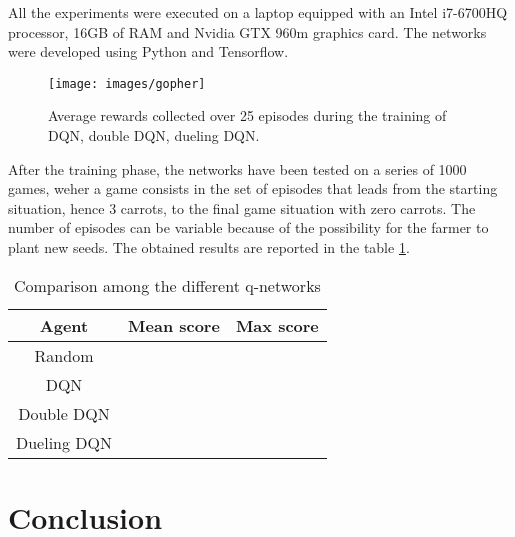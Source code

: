 \documentclass[article,11pt]{article}
\begin{document}
	All the experiments were executed on a laptop equipped with an Intel i7-6700HQ processor, 16GB of RAM and Nvidia GTX 960m graphics card. The networks were developed using Python and Tensorflow.
	
	\begin{figure}
		\texttt{[image: images/gopher]}
		\label{fig:average_reward}
		\caption{Average rewards collected over 25 episodes during the training of DQN, double DQN, dueling DQN.}
	\end{figure}
	
	After the training phase, the networks have been tested on a series of 1000 games, weher a game consists in the set of episodes that leads from the starting situation, hence 3 carrots, to the final game situation with zero carrots. The number of episodes can be variable because of the possibility for the farmer to plant new seeds.
	The obtained results are reported in the table \ref{tab:test}.
	\begin{table}
		\centering
		\begin{tabular}{|c|c|c|}
			\hline
			Agent	& Mean score & Max score\\
			\hline
			Random & & \\
			DQN & & \\
			Double DQN & & \\
			Dueling DQN & & \\
			\hline
		\end{tabular}
		\caption{Comparison among the different q-networks}
		\label{tab:test}
	\end{table}

	
	\section{Conclusion}

	
	
	
\end{document}
